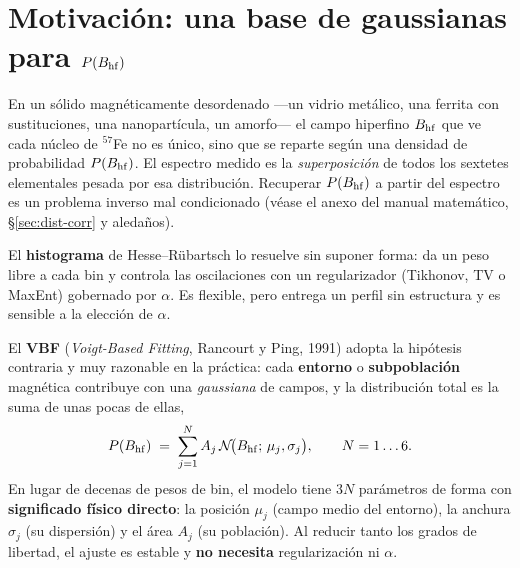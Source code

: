 
\section{Motivación: una base de gaussianas para \texorpdfstring{$P(B_{\mathrm{hf}})$}{P(BHF)}}
\label{sec:vbf-motiv}

En un sólido magnéticamente desordenado —un vidrio metálico, una ferrita con
sustituciones, una nanopartícula, un amorfo— el campo hiperfino $B_{\mathrm{hf}}$ que ve
cada núcleo de $^{57}$Fe no es único, sino que se reparte según una densidad de
probabilidad $P(B_{\mathrm{hf}})$. El espectro medido es la \emph{superposición} de todos
los sextetes elementales pesada por esa distribución. Recuperar $P(B_{\mathrm{hf}})$ a partir
del espectro es un problema inverso mal condicionado (véase el anexo del manual
matemático, \S\ref{sec:dist-corr} y aledaños).

El \textbf{histograma} de Hesse--Rübartsch lo resuelve sin suponer forma: da un
peso libre a cada bin y controla las oscilaciones con un regularizador (Tikhonov,
TV o MaxEnt) gobernado por $\alpha$. Es flexible, pero entrega un perfil sin
estructura y es sensible a la elección de $\alpha$.

El \textbf{VBF} (\emph{Voigt-Based Fitting}, Rancourt y Ping, 1991) adopta la
hipótesis contraria y muy razonable en la práctica: cada \textbf{entorno} o
\textbf{subpoblación} magnética contribuye con una \emph{gaussiana} de campos, y
la distribución total es la suma de unas pocas de ellas,
\begin{equation}
  P(B_{\mathrm{hf}}) \;=\; \sum_{j=1}^{N} A_j\,\mathcal N\!\bigl(B_{\mathrm{hf}};\,\mu_j,\sigma_j\bigr),
  \qquad N = 1\ldots6 .
  \label{eq:vbf-P}
\end{equation}
En lugar de decenas de pesos de bin, el modelo tiene $3N$ parámetros de forma con
\textbf{significado físico directo}: la posición $\mu_j$ (campo medio del entorno),
la anchura $\sigma_j$ (su dispersión) y el área $A_j$ (su población). Al reducir
tanto los grados de libertad, el ajuste es estable y \textbf{no necesita}
regularización ni $\alpha$.

